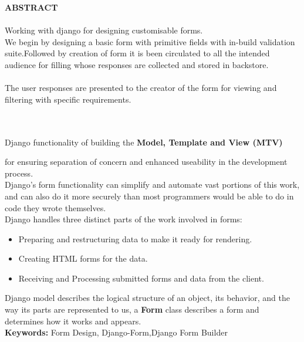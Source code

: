 \begin{center}
\thispagestyle{empty}
\vspace{2cm}

\LARGE{\textbf{ABSTRACT}}\\[1.0cm]

\end{center}
\thispagestyle{empty}
\large{\paragraph{} Working with django for designing customisable forms.\\
We begin by designing a basic form with primitive fields with in-build validation suite.Followed by creation of form it is been circulated to all the intended audience for filling whose responses are collected and stored in backstore.}
\large{\paragraph{}The user responses are presented to the creator of the form for viewing and filtering with specific requirements.}\\
\large{\paragraph{} Django functionality of building the \textbf{Model, Template and View (MTV) }} for ensuring separation of concern and enhanced useability in the development process. \\
Django's form functionality can simplify and automate vast portions of this work, and can also do it more securely than most programmers would be able to do in code they wrote themselves.\\

Django handles three distinct parts of the work involved in forms:\\
\begin{itemize}
	\item Preparing and restructuring data to make it ready for rendering.
	\item Creating HTML forms for the data.
	\item Receiving and Processing submitted forms and data from the client.
\end{itemize}
Django model describes the logical structure of an object, its behavior, and the way its parts are represented to us, a \textbf{Form} class describes a form and determines how it works and appears.\\

\vspace*{3cm}
\textbf{Keywords: }Form Design, Django-Form,Django Form Builder